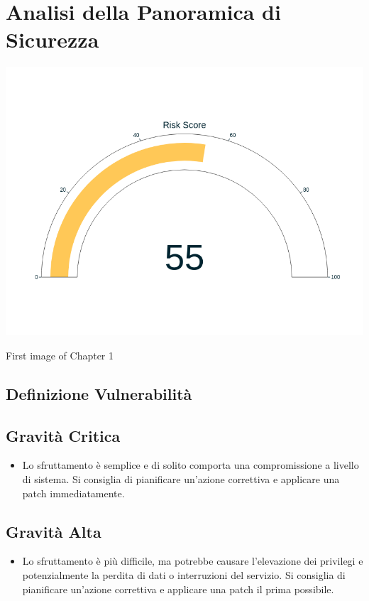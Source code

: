 \chapter{Analisi della Panoramica di Sicurezza}


\begin{center}
\includegraphics[width=\linewidth]{pngs/0_1.png}
\vspace{1cm}\caption{First image of Chapter 1}
\end{center}

\section{Definizione Vulnerabilità}
\section{Gravità Critica}
\begin{itemize}
\item Lo sfruttamento è semplice e di solito comporta una compromissione a livello di sistema. Si consiglia di pianificare un'azione correttiva e applicare una patch immediatamente.
\end{itemize}
\section{Gravità Alta}
\begin{itemize}
\item Lo sfruttamento è più difficile, ma potrebbe causare l'elevazione dei privilegi e potenzialmente la perdita di dati o interruzioni del servizio. Si consiglia di pianificare un'azione correttiva e applicare una patch il prima possibile.
\end{itemize}
